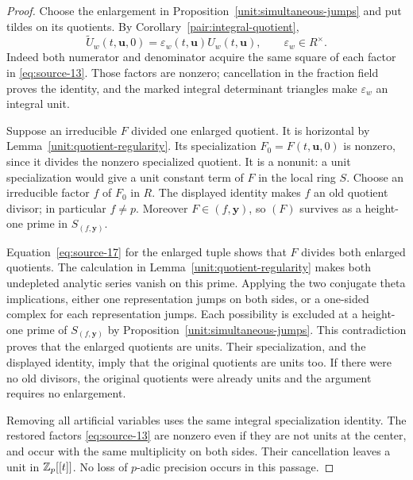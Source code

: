 \begin{proof}
Choose the enlargement in Proposition~\ref{unit:simultaneous-jumps}
and put tildes on its quotients.  By
Corollary~\ref{pair:integral-quotient},
\[
 \widetilde U_w(t,\mathbf u,0)
       =\varepsilon_w(t,\mathbf u)U_w(t,\mathbf u),
       \qquad \varepsilon_w\in R^\times.
\]
Indeed both numerator and denominator acquire the same square
of each factor in \eqref{eq:source-13}.  Those factors are nonzero;
cancellation in the fraction field proves the identity, and
the marked integral determinant triangles make $\varepsilon_w$
an integral unit.

Suppose an irreducible $F$ divided one enlarged quotient.  It is
horizontal by Lemma~\ref{unit:quotient-regularity}.  Its
specialization $F_0=F(t,\mathbf u,0)$ is nonzero, since it divides
the nonzero specialized quotient.  It is a nonunit: a unit
specialization would give a unit constant term of $F$ in the
local ring $S$.  Choose an irreducible factor $f$ of $F_0$ in
$R$.  The displayed identity makes $f$ an old quotient divisor;
in particular $f\ne p$.  Moreover
$F\in(f,\mathbf y)$, so $(F)$ survives as a height-one prime in
$S_{(f,\mathbf y)}$.

Equation~\eqref{eq:source-17} for the enlarged tuple shows that
$F$ divides both enlarged quotients.  The calculation in
Lemma~\ref{unit:quotient-regularity} makes both undepleted
analytic series vanish on this prime.  Applying the two conjugate
theta implications, either one representation jumps on both
sides, or a one-sided complex for each representation jumps.
Each possibility is excluded at a height-one prime of
$S_{(f,\mathbf y)}$ by Proposition~\ref{unit:simultaneous-jumps}.
This contradiction proves that the enlarged quotients are units.
Their specialization, and the displayed identity, imply that
the original quotients are units too.  If there were no old
divisors, the original quotients were already units and the
argument requires no enlargement.

Removing all artificial variables uses the same integral
specialization identity.  The restored factors
\eqref{eq:source-13} are nonzero even if they are not units at
the center, and occur with the same multiplicity on both sides.
Their cancellation leaves a unit in $\mathbb Z_p[[t]]$.  No loss of
$p$-adic precision occurs in this passage.
\end{proof}
